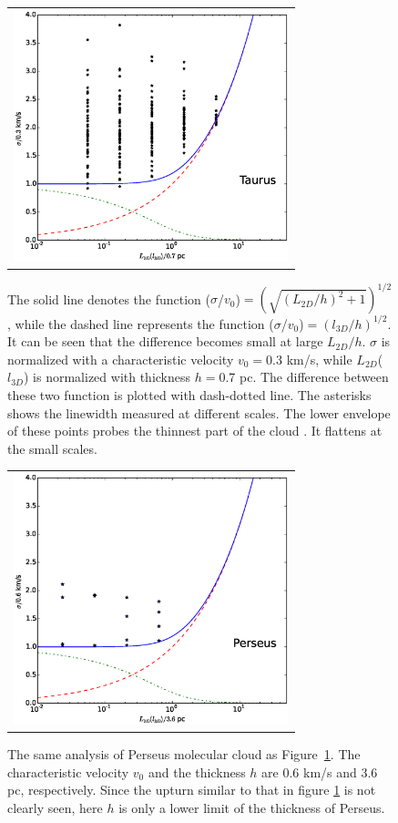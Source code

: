 \documentclass[iop,revtex4]{emulateapj}
\begin{document}
\begin{figure}[htbp]
\centering
\begin{tabular}{c}
\includegraphics[width=8cm]{width_L.eps}\\
\end{tabular}
\caption{ The solid line denotes the function ($\sigma$/$v_0$)$=\left(\sqrt{(L_{2D}/h)^2+1}\right)^{1/2}$, while the dashed line represents the function ($\sigma$/$v_0$)$= (l_{3D}/h)^{1/2}$. It can be seen that the difference becomes small at large $L_{2D}/h$.
$\sigma$ is normalized with a characteristic velocity $v_0=$0.3 km/s, while $L_{2D}$($l_{3D}$) is normalized with thickness $h=$0.7 pc. The difference between these two function is plotted with dash-dotted line. The asterisks shows the linewidth measured at different scales. The lower envelope of these points probes the thinnest part of the cloud \citep[cf.][]{Li2008}. It flattens at the small scales. \label{width_L}}
\end{figure}

\begin{figure}[htbp]
\centering
\begin{tabular}{c}
\includegraphics[width=8cm]{pera_width_L.eps}\\
\end{tabular}
\caption{ The same analysis of Perseus molecular cloud as Figure~\ref{width_L}. The characteristic velocity $v_0$ and the thickness $h$ are 0.6 km/s and 3.6 pc, respectively. Since the upturn similar to that in figure \ref{width_L} is not clearly seen, here $h$ is only a lower limit of the thickness of Perseus. \label{pera_width_L}}
\end{figure}
\end{document}
